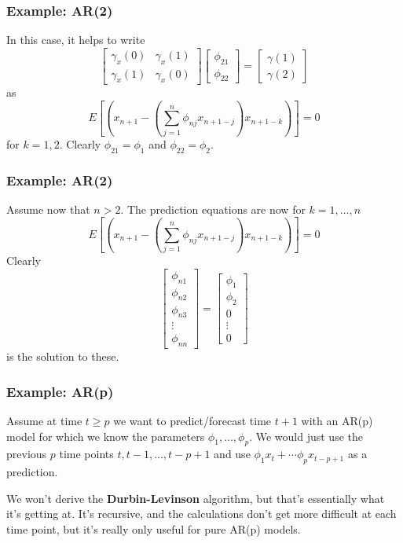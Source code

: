 \documentclass[%
xcolor=pdftex]{beamer}
\begin{document}
\begin{frame}
\frametitle{Example: AR(2)}

In this case, it helps to write 
$$
\begin{bmatrix}
\gamma_x(0) & \gamma_x(1) \\
\gamma_x(1) & \gamma_x(0)
\end{bmatrix}
\begin{bmatrix}
\phi_{21} \\
\phi_{22}
\end{bmatrix}
=
\begin{bmatrix}
\gamma(1) \\
\gamma(2)
\end{bmatrix}
$$
as
$$
E\left[ \left(x_{n+1} - \left( \sum_{j=1}^n \phi_{nj} x_{n+1-j}\right)x_{n+1-k} \right) \right] = 0
$$
for $k=1,2$. Clearly $\phi_{21} = \phi_1$ and $\phi_{22} = \phi_2$. 
\end{frame}


\begin{frame}
\frametitle{Example: AR(2)}

Assume now that $n > 2$. The prediction equations are now for $k=1,\ldots,n$
$$
E\left[ \left(x_{n+1} - \left( \sum_{j=1}^n \phi_{nj} x_{n+1-j}\right)x_{n+1-k} \right) \right] = 0
$$
Clearly 
$$
\begin{bmatrix}
\phi_{n1} \\
\phi_{n2} \\
\phi_{n3} \\
\vdots \\
\phi_{nn}
\end{bmatrix}
=
\begin{bmatrix}
\phi_{1} \\
\phi_{2} \\
0 \\
\vdots \\
0
\end{bmatrix}
$$ 
is the solution to these.
\end{frame}

\begin{frame}
\frametitle{Example: AR(p)}

Assume at time $t \ge p$ we want to predict/forecast time $t+1$ with an AR(p) model for which we know the parameters $\phi_1, \ldots, \phi_p$. We would just use the previous $p$ time points $t, t-1, \ldots, t-p+1$ and use $\phi_1 x_t + \cdots \phi_p x_{t-p+1}$ as a prediction.
\newline

We won't derive the {\bf Durbin-Levinson} algorithm, but that's essentially what it's getting at. It's recursive, and the calculations don't get more difficult at each time point, but it's really only useful for pure AR(p) models.

\end{frame}
\end{document}
